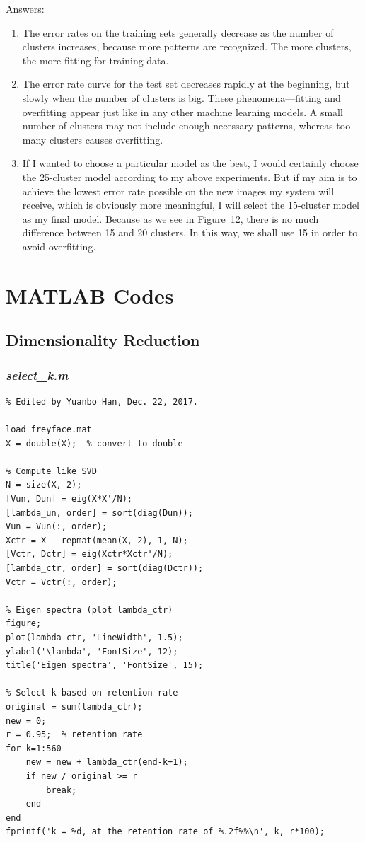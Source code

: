\documentclass{article}
\begin{document}
Answers:
\begin{enumerate}
	\item
	The error rates on the training sets generally decrease as the number of clusters increases, because more patterns are recognized. The more clusters, the more fitting for training data.
	\item
	The error rate curve for the test set decreases rapidly at the beginning, but slowly when the number of clusters is big. These phenomena---fitting and overfitting appear just like in any other machine learning models. A small number of clusters may not include enough necessary patterns, whereas too many clusters causes overfitting.
	\item
	If I wanted to choose a particular model as the best, I would certainly choose the 25-cluster model according to my above experiments. But if my aim is to achieve the lowest error rate possible on the new images my system will receive, which is obviously more meaningful, I will select the 15-cluster model as my final model. Because as we see in \hyperref[fig-12]{Figure~12}, there is no much difference between 15 and 20 clusters. In this way, we shall use 15 in order to avoid overfitting.
\end{enumerate}


\appendix
\section{MATLAB Codes}
\subsection{Dimensionality Reduction}
\subsubsection{\emph{select\_k.m}}
\begin{lstlisting}
% Edited by Yuanbo Han, Dec. 22, 2017.

load freyface.mat
X = double(X);  % convert to double

% Compute like SVD
N = size(X, 2);
[Vun, Dun] = eig(X*X'/N);
[lambda_un, order] = sort(diag(Dun));
Vun = Vun(:, order);
Xctr = X - repmat(mean(X, 2), 1, N);
[Vctr, Dctr] = eig(Xctr*Xctr'/N);
[lambda_ctr, order] = sort(diag(Dctr));
Vctr = Vctr(:, order);

% Eigen spectra (plot lambda_ctr)
figure;
plot(lambda_ctr, 'LineWidth', 1.5);
ylabel('\lambda', 'FontSize', 12);
title('Eigen spectra', 'FontSize', 15);

% Select k based on retention rate
original = sum(lambda_ctr);
new = 0;
r = 0.95;  % retention rate
for k=1:560
    new = new + lambda_ctr(end-k+1);
    if new / original >= r
        break;
    end
end
fprintf('k = %d, at the retention rate of %.2f%%\n', k, r*100);

\end{lstlisting}
\end{document}
